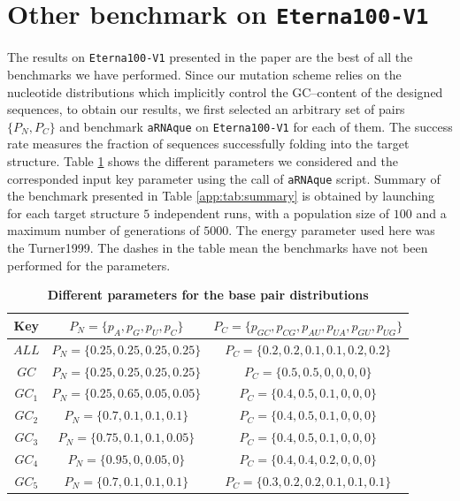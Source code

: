 \section{Other benchmark on \texttt{Eterna100-V1}}
\label{app:b4}
The results on \texttt{Eterna100-V1} presented in the paper are the best of all the benchmarks we have performed. Since our mutation scheme relies on the nucleotide distributions which implicitly control the GC--content of the designed sequences, to obtain our results, we first selected an arbitrary set of pairs $\{P_N, P_C\}$  and benchmark \texttt{aRNAque} on \texttt{Eterna100-V1} for each of them. The success rate measures the fraction of sequences successfully folding into the target structure. Table \ref{app:tab:bp} shows the different parameters we considered and the corresponded input key parameter using the call of \texttt{aRNAque} script.  Summary of the benchmark presented in Table \ref{app:tab:summary} is obtained by launching for each target structure $5$ independent runs, with a population size of $100$ and a maximum number of generations of $5000$. The energy parameter used here was the Turner1999. The dashes in the table mean the benchmarks have not been performed for the parameters.
\begin{table}[t!]
	\caption{\textbf{Different parameters for the base pair distributions}}
	\vspace*{0.5cm}
	\centering
	\begin{tabular}[H]{|c|c|c|}
		\hline 
		\textbf{Key}&\textbf{$P_N = \{p_A, p_G, p_U, p_C\}$ }& \textbf{$P_C = \{p_{GC}, p_{CG}, p_{AU}, p_{UA}, p_{GU},p_{UG}\}$}\\
		\hline 
		$ALL$ & $P_N = \{0.25, 0.25, 0.25, 0.25\}$ & $P_C = \{0.2, 0.2, 0.1, 0.1, 0.2,0.2\}$\\
		\hline
		$GC$& $P_N = \{0.25, 0.25, 0.25, 0.25\}$ & $P_C = \{0.5, 0.5, 0, 0, 0,0\}$\\
		\hline
		$GC_1$& $P_N = \{0.25, 0.65, 0.05, 0.05\}$ & $P_C = \{0.4, 0.5, 0.1, 0, 0,0\}$\\
		\hline
		$GC_2$ & $P_N = \{0.7, 0.1, 0.1, 0.1\}$ & $P_C = \{0.4, 0.5, 0.1, 0, 0,0\}$\\
		\hline
		$GC_3$ & $P_N = \{0.75, 0.1, 0.1, 0.05\}$ & $P_C = \{0.4, 0.5, 0.1, 0, 0,0\}$\\
		\hline
		$GC_4$ & $P_N = \{0.95, 0, 0.05, 0\}$ & $P_C = \{0.4, 0.4, 0.2, 0, 0,0\}$\\
		\hline
		$GC_5$& $P_N = \{0.7, 0.1, 0.1, 0.1\}$ & $P_C = \{0.3, 0.2, 0.2, 0.1, 0.1,0.1\}$\\
		\hline
	\end{tabular}
	\label{app:tab:bp}
\end{table}

